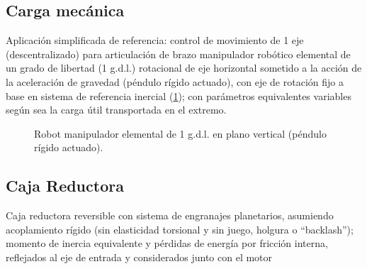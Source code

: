 \documentclass[a4paper, 10pt, onecolumn,journal]{ieeeconf}
\begin{document}
\subsection{\textbf{Carga mecánica}}
Aplicación simplificada de referencia: control de movimiento de 1 eje (descentralizado) para articulación de brazo manipulador robótico elemental de un grado de libertad (1 g.d.l.) rotacional de eje horizontal sometido a la acción de la aceleración de gravedad (péndulo rígido actuado), con eje de rotación fijo a base en sistema de referencia inercial (\cref{brazo}); con parámetros equivalentes variables según sea la carga útil transportada en el extremo.

\begin{figure}[H]
    \centering
    \begin{adjustbox}{max width=0.5\columnwidth}
    \end{adjustbox}
    \caption{Robot manipulador elemental de 1 g.d.l. en plano vertical (péndulo rígido actuado).}
    \label{brazo}
\end{figure}

\subsection{\textbf{Caja Reductora}}
Caja reductora reversible con sistema de engranajes planetarios, asumiendo acoplamiento rígido (sin elasticidad torsional y sin juego, holgura o ``backlash''); momento de inercia equivalente y pérdidas de energía por fricción interna, reflejados al eje de entrada y considerados junto con el motor
\end{document}
